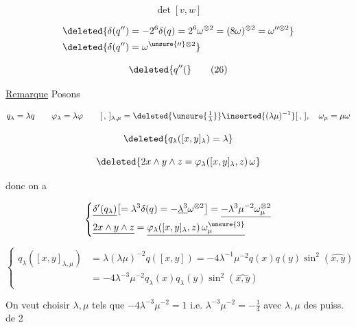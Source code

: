 \[
\det[v,w]
\]



\[
\begin{aligned}&\deleted{\delta(q'')=-2^6\delta(q)=2^6\omega^{\otimes2}=(8\omega)^{\otimes2}=\omega''^{\otimes2}}\\&\deleted{\delta(q'')=\omega^{\unsure{\prime\prime}\otimes2}}\end{aligned}
\]


\[
\deleted{q''(}\tag*{(26)}
\]

\uline{Remarque} Posons

\[
q_\lambda=\lambda q\qquad\varphi_\lambda=\lambda\varphi\qquad [\,,\,]_{\lambda,\mu}=\deleted{\unsure{\tfrac1{\lambda}}}\inserted{(\lambda\mu)^{-1}}[\,,\,],\quad\omega_\mu=\mu\omega
\]


\[
\deleted{q_\lambda([x,y]_\lambda)=\lambda}
\]

\[
\deleted{2x\wedge y\wedge z=\varphi_\lambda([x,y]_\lambda,z)\,\omega}
\]

donc on a

\[
\left\{\begin{aligned}&\underline{\delta'(q_\lambda)}\bigl[=\lambda^3\delta(q)=-\underline{\lambda^3}\omega^{\otimes2}\bigr]=\underline{-\lambda^3\mu^{-2}\omega_\mu^{\otimes2}}\\ &\underline{2x\wedge y\wedge z}=\underline{\varphi_\lambda([x,y]_\lambda,z)\,\omega_\mu^{\unsure{3}}}\end{aligned}\right.
\]

\[
\left\{\begin{aligned}q_\lambda([x,y]_{\lambda,\mu})&=\lambda(\lambda\mu)^{-2}q([x,y])=-4\lambda^{-1}\mu^{-2}q(x)q(y)\sin^2(\widehat{x,y})\\ &=-4\lambda^{-3}\mu^{-2}q_\lambda(x)q_\lambda(y)\sin^2(\widehat{x,y})\end{aligned}\right.
\]

On veut choisir $\lambda,\mu$ tels que $-4\lambda^{-3}\mu^{-2}=1$ i.e. $\lambda^{-3}\mu^{-2}=-\frac14$ avec $\lambda,\mu$ des  puiss. de 2


